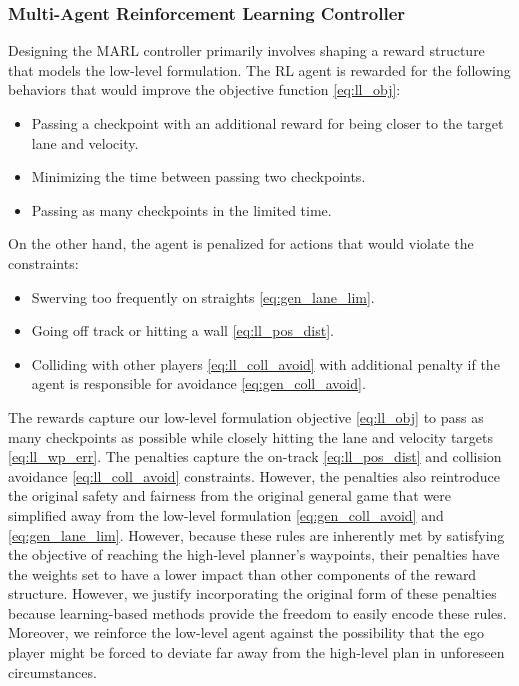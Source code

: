 \subsubsection{Multi-Agent Reinforcement Learning Controller}
Designing the MARL controller primarily involves shaping a reward structure that models the low-level formulation. The RL agent is rewarded for the following behaviors that would improve the objective function \eqref{eq:ll_obj}:
\begin{itemize}
    \item Passing a checkpoint with an additional reward for being closer to the target lane and velocity.
    \item Minimizing the time between passing two checkpoints.
    \item Passing as many checkpoints in the limited time.
\end{itemize}
On the other hand, the agent is penalized for actions that would violate the constraints:
\begin{itemize}
    \item Swerving too frequently on straights \eqref{eq:gen_lane_lim}.
    \item Going off track or hitting a wall \eqref{eq:ll_pos_dist}.
    \item Colliding with other players \eqref{eq:ll_coll_avoid} with additional penalty if the agent is responsible for avoidance \eqref{eq:gen_coll_avoid}. 
\end{itemize}

The rewards capture our low-level formulation objective \eqref{eq:ll_obj} to pass as many checkpoints as possible while closely hitting the lane and velocity targets \eqref{eq:ll_wp_err}. The penalties capture the on-track \eqref{eq:ll_pos_dist} and collision avoidance \eqref{eq:ll_coll_avoid} constraints. However, the penalties also reintroduce the original safety and fairness from the original general game that were simplified away from the low-level formulation \eqref{eq:gen_coll_avoid} and \eqref{eq:gen_lane_lim}. However, because these rules are inherently met by satisfying the objective of reaching the high-level planner's waypoints, their penalties have the weights set to have a lower impact than other components of the reward structure. However, we justify incorporating the original form of these penalties because learning-based methods provide the freedom to easily encode these rules. Moreover, we reinforce the low-level agent against the possibility that the ego player might be forced to deviate far away from the high-level plan in unforeseen circumstances.

